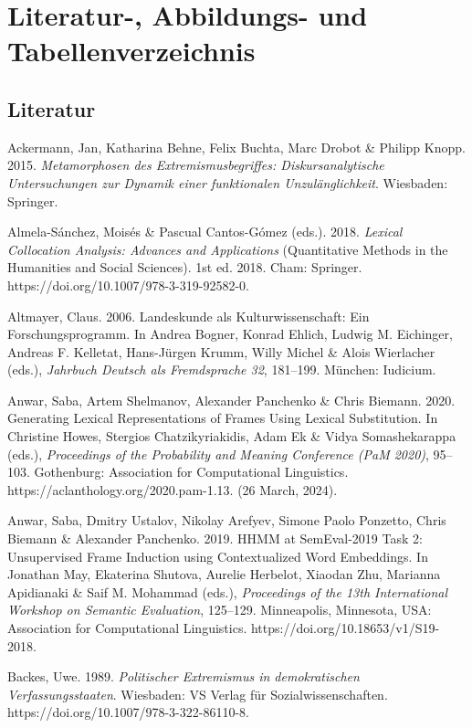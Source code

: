 \chapter{Literatur-, Abbildungs- und Tabellenverzeichnis}\label{literatur--abbildungs--und-tabellenverzeichnis}

\section{Literatur}\label{literatur}

Ackermann, Jan, Katharina Behne, Felix Buchta, Marc Drobot \& Philipp Knopp. 2015. \emph{Metamorphosen des Extremismusbegriffes: Diskursanalytische Untersuchungen zur Dynamik einer funktionalen Unzulänglichkeit}. Wiesbaden: Springer.

Almela-Sánchez, Moisés \& Pascual Cantos-Gómez (eds.). 2018. \emph{Lexical Collocation Analysis: Advances and Applications} (Quantitative Methods in the Humanities and Social Sciences). 1st ed. 2018. Cham: Springer. https://doi.org/10.1007/978-3-319-92582-0.

Altmayer, Claus. 2006. Landeskunde als Kulturwissenschaft: Ein Forschungsprogramm. In Andrea Bogner, Konrad Ehlich, Ludwig M. Eichinger, Andreas F. Kelletat, Hans-Jürgen Krumm, Willy Michel \& Alois Wierlacher (eds.), \emph{Jahrbuch Deutsch als Fremdsprache 32}, 181--199. München: Iudicium.

Anwar, Saba, Artem Shelmanov, Alexander Panchenko \& Chris Biemann. 2020. Generating Lexical Representations of Frames Using Lexical Substitution. In Christine Howes, Stergios Chatzikyriakidis, Adam Ek \& Vidya Somashekarappa (eds.), \emph{Proceedings of the Probability and Meaning Conference (PaM 2020)}, 95--103. Gothenburg: Association for Computational Linguistics. https://aclanthology.org/2020.pam-1.13. (26 March, 2024).

Anwar, Saba, Dmitry Ustalov, Nikolay Arefyev, Simone Paolo Ponzetto, Chris Biemann \& Alexander Panchenko. 2019. HHMM at SemEval-2019 Task 2: Unsupervised Frame Induction using Contextualized Word Embeddings. In Jonathan May, Ekaterina Shutova, Aurelie Herbelot, Xiaodan Zhu, Marianna Apidianaki \& Saif M. Mohammad (eds.), \emph{Proceedings of the 13th International Workshop on Semantic Evaluation}, 125--129. Minneapolis, Minnesota, USA: Association for Computational Linguistics. https://doi.org/10.18653/v1/S19-2018.

Backes, Uwe. 1989. \emph{Politischer Extremismus in demokratischen Verfassungsstaaten}. Wiesbaden: VS Verlag für Sozialwissenschaften. https://doi.org/10.1007/978-3-322-86110-8.

